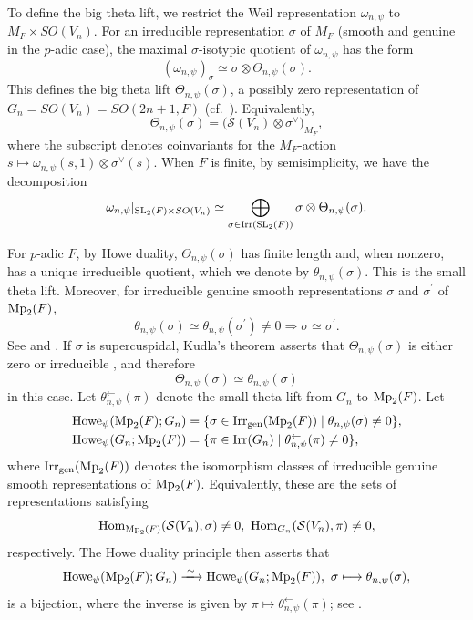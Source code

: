 \documentclass[12pt]{amsart}
\theoremstyle{definition}
\theoremstyle{remark}
\begin{document}
To define the big theta lift, we restrict the Weil representation
$\omega_{n,\psi}$ to $M_F\times SO(V_n)$.
For an irreducible representation $\sigma$ of $M_F$
(smooth and genuine in the $p$-adic case), the maximal
$\sigma$-isotypic quotient of $\omega_{n,\psi}$ has the form
\begin{equation}\label{eq-theta}
(\omega_{n,\psi})_\sigma
\simeq \sigma\otimes\Theta_{n,\psi}(\sigma).
\end{equation}
This defines the big theta lift $\Theta_{n,\psi}(\sigma)$,
a possibly zero representation of $G_n = SO(V_n)=SO(2n+1,F)$
(cf.~\cite[\S 4]{pra98}).
Equivalently,
\begin{equation}\label{eq-can}
\Theta_{n,\psi}(\sigma)
=\bigl(\mathcal S(V_n)\otimes\sigma^\vee\bigr)_{M_F},
\end{equation}
where the subscript denotes coinvariants for the $M_F$-action
$s \mapsto \omega_{n,\psi}(s,1)\otimes\sigma^\vee(s)$.
When $F$ is finite, by semisimplicity, we have the decomposition
\[
\omega_{n,\psi}|_{{\rm SL}_2(F)\times SO(V_n)}
\simeq
\bigoplus_{\sigma\in{\rm Irr}({\rm SL}_2(F))}
\sigma\otimes\Theta_{n,\psi}(\sigma).
\]

For $p$-adic $F$, by Howe duality, $\Theta_{n,\psi}(\sigma)$
has finite length and, when nonzero, has a unique irreducible
quotient, which we denote by $\theta_{n,\psi}(\sigma)$. This is the small theta lift. Moreover, for irreducible genuine smooth representations
$\sigma$ and $\sigma^\prime$ of ${\rm Mp}_2(F)$,
\[
\theta_{n,\psi}(\sigma)\simeq\theta_{n,\psi}(\sigma^\prime)\ne0
\Longrightarrow
\sigma\simeq\sigma^\prime.
\]
See \cite[\S 4, Theorem 6]{pra98} and
\cite[\S II.2, Howe Duality Principle]{kud96}. If $\sigma$ is supercuspidal, Kudla's theorem asserts that
$\Theta_{n,\psi}(\sigma)$ is either zero or irreducible \cite[\S III.6, Theorem 6.1(i)]{kud96},
and therefore
\[
\Theta_{n,\psi}(\sigma)\simeq\theta_{n,\psi}(\sigma)
\]
in this case. Let 
$\theta_{n,\psi}^{\leftarrow}(\pi)$ denote the small theta lift
from $G_n$ to ${\rm Mp}_2(F)$. Let
\begin{align*}
{\rm Howe}_\psi({\rm Mp}_2(F);G_n)
&=\{\sigma\in {\rm Irr}_{{\rm gen}}({\rm Mp}_2(F))
       \mid \theta_{n,\psi}(\sigma)\neq 0\},\\
{\rm Howe}_\psi(G_n;{\rm Mp}_2(F))
&=\{\pi\in {\rm Irr}(G_n)
       \mid \theta_{n,\psi}^{\leftarrow}(\pi)\neq 0\},
\end{align*}
where ${\rm Irr}_{{\rm gen}}({\rm Mp}_2(F))$ denotes the
isomorphism classes of irreducible genuine smooth
representations of ${\rm Mp}_2(F)$. Equivalently, these are the sets
of representations satisfying
\[
{\rm Hom}_{{\rm Mp}_2(F)}(\mathcal S(V_n),\sigma)\neq 0,
~
{\rm Hom}_{G_n}(\mathcal S(V_n),\pi)\neq 0,
\]
respectively. The Howe duality principle then asserts that
\begin{equation}\label{eq-howe}
{\rm Howe}_\psi({\rm Mp}_2(F);G_n)
\xrightarrow{\;\sim\;}
{\rm Howe}_\psi(G_n;{\rm Mp}_2(F)),
~
\sigma\longmapsto\theta_{n,\psi}(\sigma),
\end{equation}
is a bijection, where the inverse is given by
$\pi\longmapsto\theta_{n,\psi}^{\leftarrow}(\pi)$;
see \cite[\S II.2, p.~33]{kud96}.
\end{document}

